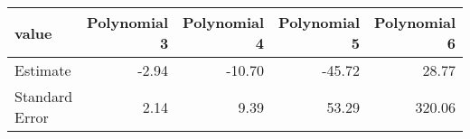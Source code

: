 \begin{tabular}{lrrrr}
  \hline
value & Polynomial 3 & Polynomial 4 & Polynomial 5 & Polynomial 6 \\ 
  \hline
Estimate & -2.94 & -10.70 & -45.72 & 28.77 \\ 
  Standard Error & 2.14 & 9.39 & 53.29 & 320.06 \\ 
   \hline
\end{tabular}
